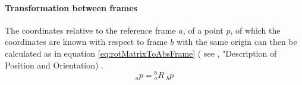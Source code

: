 \paragraph{Transformation between frames}
The coordinates relative to the reference frame ${a}$, of a point $p$, of which the coordinates are known with respect to frame ${b}$ with the same origin can then be calculated as in equation \ref{eq:rotMatrixToAbsFrame}  ( see \cite{RobotKinemDyn}, "Description of Position and Orientation) .
\begin{equation}\label{eq:rotMatrixToAbsFrame}
\phantom{}_a p = \phantom{}^b_aR \phantom{.}_b p  
\end{equation}


